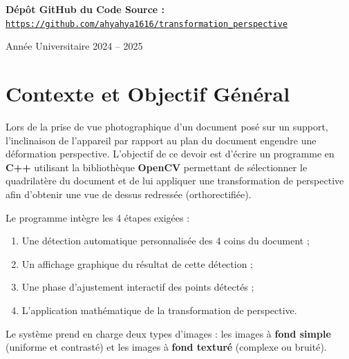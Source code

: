 \documentclass[a4paper,11pt]{article}
\begin{document}
\begin{titlepage}
    \vfill
    
    \begin{tcolorbox}[colback=gray!10!white,colframe=gray!40!white,arc=2mm,boxrule=0.5pt,center]
        \centering\footnotesize
        \textbf{Dépôt GitHub du Code Source :} \href{https://github.com/ahyahya1616/transformation_perspective}{\texttt{https://github.com/ahyahya1616/transformation_perspective}}
    \end{tcolorbox}
    
    \vspace{0.5cm}
    {\small Année Universitaire 2024 -- 2025 \par}
\end{titlepage}

\section{Contexte et Objectif Général}

Lors de la prise de vue photographique d'un document posé sur un support, l'inclinaison de l'appareil par rapport au plan du document engendre une déformation perspective. L'objectif de ce devoir est d'écrire un programme en \textbf{C++} utilisant la bibliothèque \textbf{OpenCV} permettant de sélectionner le quadrilatère du document et de lui appliquer une transformation de perspective afin d'obtenir une vue de dessus redressée (orthorectifiée).

Le programme intègre les 4 étapes exigées :
\begin{enumerate}
    \item Une détection automatique personnalisée des 4 coins du document ;
    \item Un affichage graphique du résultat de cette détection ;
    \item Une phase d'ajustement interactif des points détectés ;
    \item L'application mathématique de la transformation de perspective.
\end{enumerate}

Le système prend en charge deux types d'images : les images à \textbf{fond simple} (uniforme et contrasté) et les images à \textbf{fond texturé} (complexe ou bruité).

\end{document}
